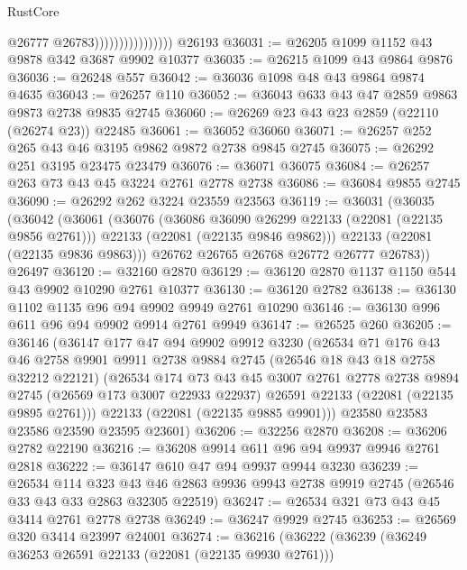 \begin{lexlean}{RustCore}
\begin{coremodule}
                                    @26777
                                    @26783))))))))))))))))
    @26193
@36031 := @26205 @1099 @1152 @43 @9878 @342 @3687 @9902 @10377
@36035 := @26215 @1099 @43 @9864 @9876
@36036 := @26248 @557
@36042 := @36036 @1098 @48 @43 @9864 @9874 @4635
@36043 := @26257 @110
@36052 := @36043 @633 @43 @47 @2859 @9863 @9873 @2738 @9835 @2745
@36060 := @26269 @23 @43 @23 @2859 (@22110 (@26274 @23)) @22485
@36061 := @36052 @36060
@36071 := @26257 @252 @265 @43 @46 @3195 @9862 @9872 @2738 @9845 @2745
@36075 := @26292 @251 @3195 @23475 @23479
@36076 := @36071 @36075
@36084 := @26257 @263 @73 @43 @45 @3224 @2761 @2778 @2738
@36086 := @36084 @9855 @2745
@36090 := @26292 @262 @3224 @23559 @23563
@36119 := @36031
    (@36035
      (@36042
        (@36061
          (@36076
            (@36086 @36090 @26299 @22133 (@22081 (@22135 @9856 @2761)))
            @22133
            (@22081 (@22135 @9846 @9862)))
          @22133
          (@22081 (@22135 @9836 @9863)))
        @26762
        @26765
        @26768
        @26772
        @26777
        @26783))
    @26497
@36120 := @32160 @2870
@36129 := @36120 @2870 @1137 @1150 @544 @43 @9902 @10290 @2761 @10377
@36130 := @36120 @2782
@36138 := @36130 @1102 @1135 @96 @94 @9902 @9949 @2761 @10290
@36146 := @36130 @996 @611 @96 @94 @9902 @9914 @2761 @9949
@36147 := @26525 @260
@36205 := @36146
    (@36147
      @177
      @47
      @94
      @9902
      @9912
      @3230
      (@26534
        @71
        @176
        @43
        @46
        @2758
        @9901
        @9911
        @2738
        @9884
        @2745
        (@26546 @18 @43 @18 @2758 @32212 @22121)
        (@26534
          @174
          @73
          @43
          @45
          @3007
          @2761
          @2778
          @2738
          @9894
          @2745
          (@26569 @173 @3007 @22933 @22937)
          @26591
          @22133
          (@22081 (@22135 @9895 @2761)))
        @22133
        (@22081 (@22135 @9885 @9901)))
      @23580
      @23583
      @23586
      @23590
      @23595
      @23601)
@36206 := @32256 @2870
@36208 := @36206 @2782 @22190
@36216 := @36208 @9914 @611 @96 @94 @9937 @9946 @2761 @2818
@36222 := @36147 @610 @47 @94 @9937 @9944 @3230
@36239 := @26534
    @114
    @323
    @43
    @46
    @2863
    @9936
    @9943
    @2738
    @9919
    @2745
    (@26546 @33 @43 @33 @2863 @32305 @22519)
@36247 := @26534 @321 @73 @43 @45 @3414 @2761 @2778 @2738
@36249 := @36247 @9929 @2745
@36253 := @26569 @320 @3414 @23997 @24001
@36274 := @36216
    (@36222
      (@36239
        (@36249 @36253 @26591 @22133 (@22081 (@22135 @9930 @2761)))

\end{coremodule}
\end{lexlean}
